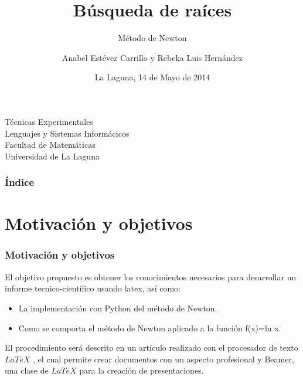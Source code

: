 \documentclass{beamer}
\title[Búsqueda de raíces]{Búsqueda de raíces}
\subtitle[Método de Newton]{Método de Newton}
\author[Anabel Estévez y Rebeka Luis]{Anabel Estévez Carrillo y Rebeka Luis Hernández}
\date[14-05-14]{La Laguna, 14 de Mayo de 2014}
\begin{document}
\begin{frame}

  \hspace*{7.0cm}
  \titlepage

  \begin{small}
    \begin{center}
     Técnicas Experimentales \\
     Lenguajes y Sistemas Informácicos \\
     Facultad de Matemáticas \\
     Universidad de La Laguna
    \end{center}
  \end{small}

\end{frame}

\begin{frame}
  \frametitle{Índice}
  \tableofcontents[pausesections]
\end{frame}

\section{Motivación y objetivos}


\begin{frame}

\frametitle{Motivación y objetivos}

El objetivo propuesto es obtener los conocimientos necesarios para desarrollar un informe tecnico-científico usando latex, así como:
\begin{itemize}
\item
 La implementación con Python del método de Newton. \pause
\item
 Como se comporta el método de Newton aplicado a la función f(x)=ln x.\pause
\end{itemize}

El procedimiento será descrito en un artículo realizado con el procesador de texto  $LaTeX$ , el cual permite crear documentos con un aspecto profesional y Beamer, una clase de $LaTeX$  para la creación de presentaciones.

\end{frame}
\end{document}
